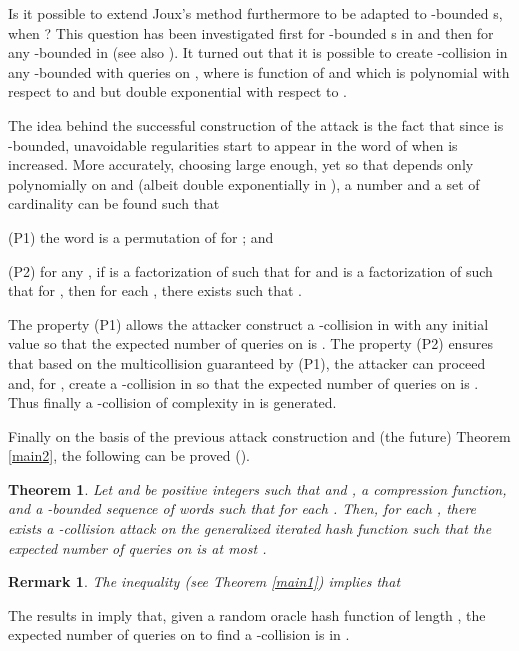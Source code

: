 \documentclass[submission,copyright,creativecommons]{eptcs}
\newcounter{dep}
\newcounter{dol}
\newenvironment{yks}
{
\setlength{\parskip}{1pt}
\begin{list}
{}{\usecounter{dol}\setlength{\topsep}{0pt}\setlength{\rightmargin}{\leftmargin}\setlength{\parsep}{0pt}\setlength{\itemsep}{0pt}}
}
{\end{list}}
\newtheorem{theorem}{Theorem}
\newtheorem{remark}{Rermark}
\begin{document}
Is it possible to extend Joux's method furthermore to be adapted to -bounded s, when ? This question has been investigated first for -bounded s in \cite{NaS} and then for any -bounded  in \cite{HoS} (see also \cite{KHK}). It turned out that it is possible to create -collision in any -bounded  with   queries on , where  is function of  and  which is polynomial with respect to  and  but double exponential with respect to . 

The idea behind the successful construction of the attack is the fact that since
 is -bounded, unavoidable regularities start to appear
in the word  of  when  is increased. More
accurately, choosing  large enough, yet so that  depends only
polynomially on  and  (albeit double exponentially in ), a number  and a set  of cardinality  can be found such that
\begin{yks}
\item[(P1)]  the word 
   is a permutation of  for ; and
\item[(P2)] for any , if
   is a factorization of
   such that  for  and  is a
  factorization of  such that 
  for , then for each 
  , there exists   such
  that .
\end{yks}

The property (P1) allows the attacker construct a -collision  in
 with any initial value  so that the expected number
of queries on  is . The property (P2) ensures that based on the multicollision  guaranteed by (P1),
the attacker can proceed and, for , create a -collision  in  so that the expected number of queries on  is . Thus finally a -collision of complexity  in 
 is generated.

Finally on the basis of the previous attack construction and (the future) Theorem \ref{main2}, the following can be proved  (\cite{KKV}).

\begin{theorem}\label{main3}
Let  and  be positive integers such that  and ,  a compression function, and  a -bounded sequence of words such that  for each
. Then, for each , there exists a -collision attack on the generalized iterated hash function  such that the expected number of queries on  is at most .
\end{theorem}

\begin{remark}
The inequality  (see Theorem \ref{main1}) implies that  
\end{remark}

The results in \cite{STKT} imply that, given a random oracle hash function  of length , the expected number of queries on  to find a -collision is in . 
\end{document}
